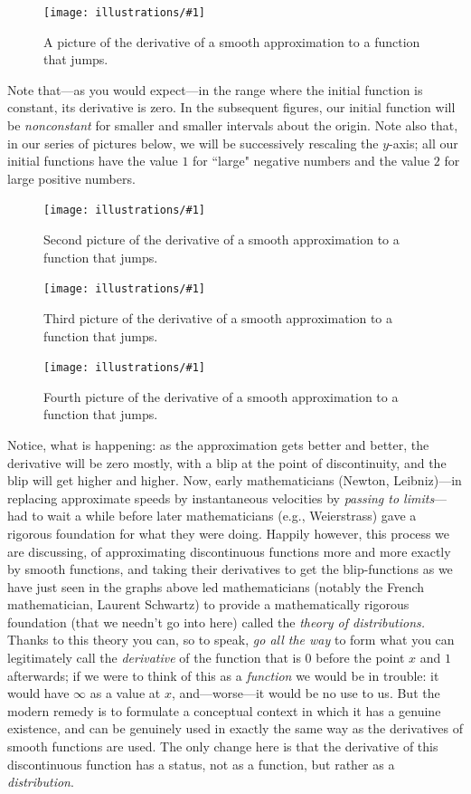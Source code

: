 \documentclass[11pt]{article}
\newcommand{\ill}[3]{ 
   \begin{figure}[H]
   \begin{center}
   \texttt{[image: illustrations/\#1]}
   \caption{#3}
   \end{center}
    \end{figure}
}
\theoremstyle{plain}
\theoremstyle{definition}
\numberwithin{equation}{section}
\numberwithin{figure}{section}
\numberwithin{table}{section}
\begin{document}
\ill{jump-smooth-deriv-point700000000000000}{0.6}{A picture of the derivative of
a smooth approximation to a function that jumps.}

Note that---as you would expect---in the range where the initial
function is constant, its derivative is zero. In the subsequent
figures, our initial function will be {\it nonconstant} for smaller
and smaller intervals about the origin. Note also that, in our series
of pictures below, we will be successively rescaling the $y$-axis; all
our initial functions have the value $1$ for ``large" negative numbers
and the value $2$ for large positive numbers.

\ill{jump-smooth-deriv-point200000000000000}{0.5}{Second picture of the derivative of
a smooth approximation to a function that jumps.}
\ill{jump-smooth-deriv-point0500000000000000}{0.5}{Third picture of the derivative of
a smooth approximation to a function that jumps.}
\ill{jump-smooth-deriv-point0100000000000000}{0.5}{Fourth picture of the derivative of
a smooth approximation to a function that jumps.}


Notice, what is happening: as the approximation gets better and
better, the derivative will be zero mostly, with a blip at the point
of discontinuity, and the blip will get higher and higher.  Now, early
mathematicians (Newton, Leibniz)---in replacing approximate speeds by
instantaneous velocities by {\em passing to limits}---had to wait a
while before later mathematicians (e.g., Weierstrass) gave a rigorous
foundation for what they were doing.  Happily however, this process we
are discussing, of approximating discontinuous functions more and more
exactly by smooth functions, and taking their derivatives to get the
blip-functions as we have just seen in the graphs above led
mathematicians (notably the French mathematician, Laurent Schwartz) to
provide a mathematically rigorous foundation (that we needn't go into
here) called the {\em theory of distributions.} Thanks to this theory
you can, so to speak, {\em go all the way} to form what you can
legitimately call the {\em derivative} of the function that is $0$
before the point $x$ and $1$ afterwards; if we were to think of this
as a {\em function} we would be in trouble: it would have $\infty$ as
a value at $x$, and---worse---it would be no use to us. But the modern
remedy is to formulate a conceptual context in which it has a genuine
existence, and can be genuinely used in exactly the same way as the
derivatives of smooth functions are used. The only change here is that
the derivative of this discontinuous function has a status, not as a
function, but rather as a {\em distribution}.  
\end{document}
